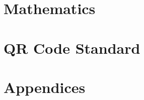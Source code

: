 \documentclass[12pt]{codex} %
\begin{document}
\part{Mathematics}



\part{QR Code Standard}



\printglossary


\part{Appendices}



\clearpage
\renewcommand{\thechapter}{\arabic{chapter}}
\renewcommand{\thesection}{\arabic{chapter}.\arabic{section}}
\renewcommand{\appendixname}{} %

\makeatletter
\let\@chapapp\chaptername      %
\let\Hy@chapter\@chapter        %
\makeatother


\printbibliography
\end{document}
